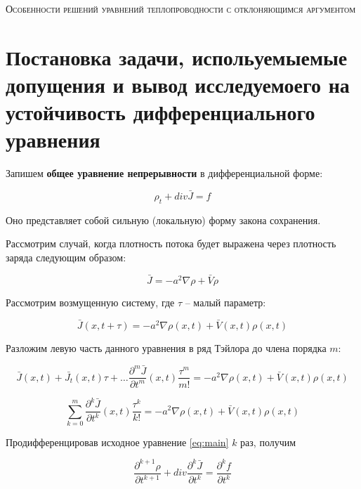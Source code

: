 \begin{center}
\textsc{\Huge{Особенности решений уравнений теплопроводности с отклоняющимся аргументом\\}}
\end{center}

\section{Постановка задачи, испольуемыемые допущения и вывод исследуемоего на устойчивость дифференциального уравнения}

Запишем \textbf{общее уравнение непрерывности} в дифференциальной форме:

\begin{equation}\label{eq:main}
\rho_t + div \bar{J} = f
\end{equation}

Оно представляет собой сильную (локальную) форму закона сохранения.

Рассмотрим случай, когда плотность потока будет выражена через плотность заряда следующим образом:

\begin{equation}
\bar{J} = -a^2 \nabla \rho + \bar{V} \rho
\end{equation}

Рассмотрим возмущенную систему, где $\tau$ \--- малый параметр:

\begin{equation*}
\bar{J}(x,t+\tau) = -a^2 \nabla \rho(x,t) + \bar{V}(x,t) \rho(x,t)
\end{equation*}

Разложим левую часть данного уравнения в ряд Тэйлора до члена порядка $m$:

\begin{equation*}
\bar{J}(x,t) + \bar{J_t}(x,t) \tau + \dots \dfrac{\partial^m \bar{J}}{\partial t^m}(x,t) \dfrac{\tau^m}{m!} = -a^2 \nabla \rho(x,t) + \bar{V}(x,t) \rho(x,t)
\end{equation*}

\begin{equation}\label{eq:sub}
\sum\limits_{k=0}^{m} \dfrac{\partial^k \bar{J}}{\partial t^k}(x,t) \dfrac{\tau^k}{k!} = -a^2 \nabla \rho(x,t) + \bar{V}(x,t) \rho(x,t)
\end{equation}

Продифференцировав исходное уравнение \ref{eq:main} $k$ раз, получим

\begin{equation*}
\dfrac{\partial^{k+1} \rho}{\partial t^{k+1}} + div \dfrac{\partial^k \bar{J}}{\partial t^k} = \dfrac{\partial^k f}{\partial t^k}
\end{equation*}

